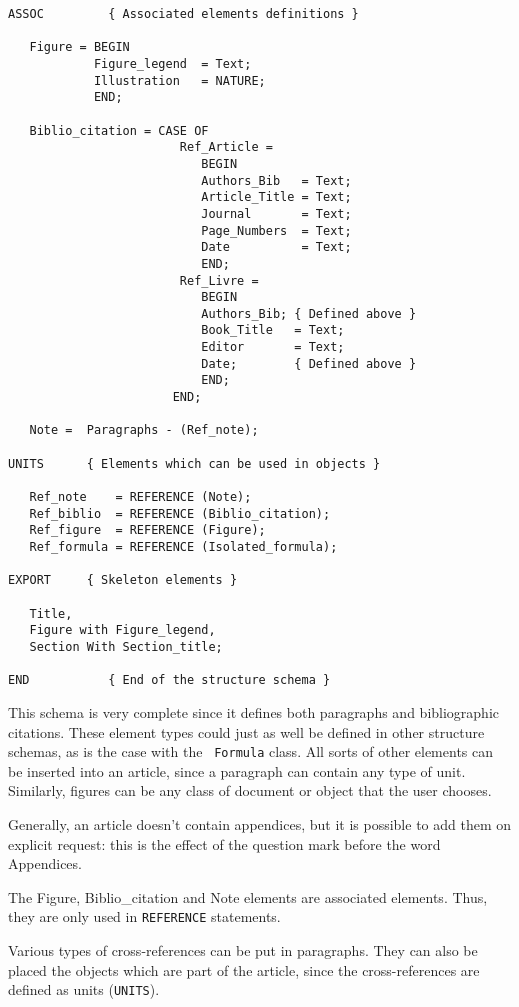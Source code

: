 \begin{verbatim}
ASSOC         { Associated elements definitions }

   Figure = BEGIN
            Figure_legend  = Text;
            Illustration   = NATURE;
            END;

   Biblio_citation = CASE OF
                        Ref_Article =
                           BEGIN
                           Authors_Bib   = Text;
                           Article_Title = Text;
                           Journal       = Text;
                           Page_Numbers  = Text;
                           Date          = Text;
                           END;
                        Ref_Livre =
                           BEGIN
                           Authors_Bib; { Defined above }
                           Book_Title   = Text;
                           Editor       = Text;
                           Date;        { Defined above }
                           END;
                       END;

   Note =  Paragraphs - (Ref_note);

UNITS      { Elements which can be used in objects }

   Ref_note    = REFERENCE (Note);
   Ref_biblio  = REFERENCE (Biblio_citation);
   Ref_figure  = REFERENCE (Figure);
   Ref_formula = REFERENCE (Isolated_formula);

EXPORT     { Skeleton elements }

   Title,
   Figure with Figure_legend,
   Section With Section_title;

END           { End of the structure schema }
\end{verbatim}

This schema is very complete since it defines both paragraphs and
bibliographic citations.  These element types could just as well be
defined in other structure schemas, as is the case with the {\tt
Formula} class.  All sorts of other elements can be inserted into an
article, since a paragraph can contain any type of unit.  Similarly,
figures can be any class of document or object that the user chooses.

Generally, an article doesn't contain appendices, but it is possible
to add them on explicit request:  this is the effect of the question
mark before the word Appendices.

The Figure, Biblio\_citation and Note elements are associated
elements.  Thus, they are only used in {\tt REFERENCE} statements.

Various types of cross-references can be put in paragraphs.  They can
also be placed the objects which are part of the article, since the
cross-references are defined as units ({\tt UNITS}).


